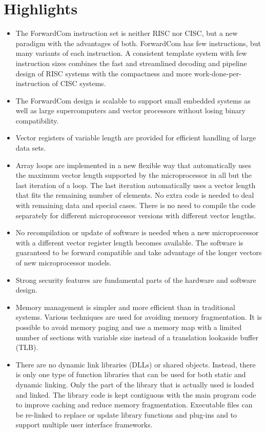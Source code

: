 \documentclass[forwardcom.tex]{subfiles}
\begin{document}
\section{Highlights}
\begin{itemize}
\item The ForwardCom instruction set is neither RISC nor CISC, but a new paradigm with the advantages of both. ForwardCom has few instructions, but many variants of each instruction. A consistent template system with few instruction sizes combines the fast and streamlined decoding and pipeline design of RISC systems with the compactness and more work-done-per-instruction of CISC systems. 

\item The ForwardCom design is scalable to support small embedded systems as well as large supercomputers and vector processors without losing binary compatibility.

\item Vector registers of variable length are provided for efficient handling of large data sets.

\item Array loops are implemented  in a new flexible way that automatically uses the maximum vector length supported by the microprocessor in all but the last iteration of a loop. The last iteration automatically uses a vector length that fits the remaining number of elements. No extra code is needed to deal with remaining data and special cases. There is no need to compile the code separately for different microprocessor versions with different vector lengths.

\item No recompilation or update of software is needed when a new microprocessor with a different vector register length becomes available. The software is guaranteed to be forward compatible and take advantage of the longer vectors
of new microprocessor models.

\item Strong security features are fundamental parts of the hardware and software design.

\item Memory management is simpler and more efficient than in traditional systems. Various techniques are used for avoiding memory fragmentation. 
It is possible to avoid memory paging and use a memory map with a limited number of sections with variable size instead of a translation lookaside buffer (TLB).

\item There are no dynamic link libraries (DLLs) or shared objects. Instead, there is only one type of function libraries 
that can be used for both static and dynamic linking. Only the part of the library that is actually used is loaded and linked. The library code is kept contiguous with the main program code to improve caching and reduce memory fragmentation. 
Executable files can be re-linked to replace or update library functions and plug-ins and to support multiple user interface frameworks.


\end{itemize}
\end{document}
